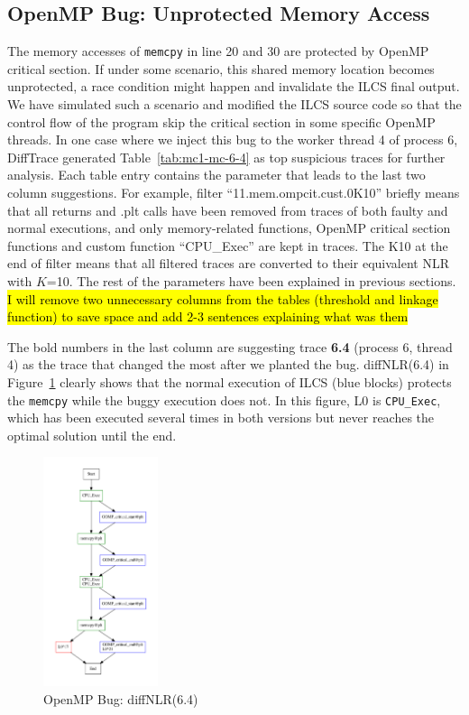 \subsection{OpenMP Bug: Unprotected Memory Access}





The memory accesses of \texttt{memcpy} in line 20 and 30 are protected by OpenMP critical section.
%
If under some scenario, this shared memory location becomes unprotected, a race condition might happen and invalidate the ILCS final output.
%
We have simulated such a scenario and modified the ILCS source code so that the control flow of the program skip the critical section in some specific OpenMP threads.
%
In one case where we inject this bug to the worker thread 4 of process 6, DiffTrace generated Table~\ref{tab:mc1-mc-6-4} as top suspicious traces for further analysis.
%
Each table entry contains the parameter that leads to the last two column suggestions.
%
For example, filter ``11.mem.ompcit.cust.0K10'' briefly means that all returns and .plt calls have been removed from traces of both faulty and normal executions, and only memory-related functions, OpenMP critical section functions and custom function ``CPU\_Exec'' are kept in traces.
%
The K10 at the end of filter means that all filtered traces are converted to their equivalent NLR with $K$=10.
%
The rest of the parameters have been explained in previous sections.
%
\hl{I will remove two unnecessary columns from the tables (threshold and linkage function) to save space and add 2-3 sentences explaining what was them}

The bold numbers in the last column are suggesting trace \textbf{6.4} (process 6, thread 4) as the trace that changed the most after we planted the bug.
%
diffNLR(6.4) in Figure~\ref{diffNLR-6-4} clearly shows that the normal execution of ILCS (blue blocks) protects the \texttt{memcpy} while the buggy execution does not. In this figure, L0 is \texttt{CPU\_Exec}, which has been executed several times in both versions but never reaches the optimal solution until the end.
%


\begin{figure}[]
\centering
\includegraphics[width=0.3\textwidth]{figs/diffNLR/ompBug-6-4.pdf}
\caption{OpenMP Bug: diffNLR(6.4)}
\label{diffNLR-6-4}
\end{figure}

